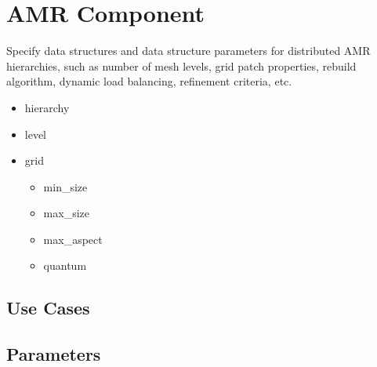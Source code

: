 \section{AMR Component} \label{s:component-amr}

Specify data structures and data structure parameters for distributed
AMR hierarchies, such as number of mesh levels, grid patch properties,
rebuild algorithm, dynamic load balancing, refinement criteria, etc.

\begin{itemize}
\item hierarchy
\item level
\item grid
\begin{itemize}
\item min\_size
\item max\_size
\item max\_aspect
\item quantum
\end{itemize}
\end{itemize}

\subsection{Use Cases}
\subsection{Parameters}
